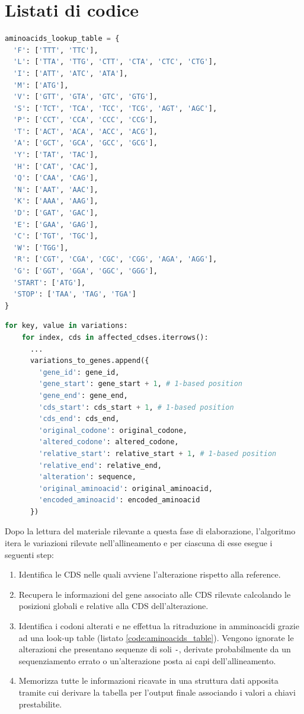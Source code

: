 \documentclass[11pt,italian]{article}
\begin{document}
\newpage
\section{Listati di codice}
\begin{lstlisting}[language=Python,caption=Tabella per la traduzione in amminoacidi,label=code:aminoacids_table]
aminoacids_lookup_table = {
  'F': ['TTT', 'TTC'],
  'L': ['TTA', 'TTG', 'CTT', 'CTA', 'CTC', 'CTG'],
  'I': ['ATT', 'ATC', 'ATA'],
  'M': ['ATG'],
  'V': ['GTT', 'GTA', 'GTC', 'GTG'],
  'S': ['TCT', 'TCA', 'TCC', 'TCG', 'AGT', 'AGC'],
  'P': ['CCT', 'CCA', 'CCC', 'CCG'],
  'T': ['ACT', 'ACA', 'ACC', 'ACG'],
  'A': ['GCT', 'GCA', 'GCC', 'GCG'],
  'Y': ['TAT', 'TAC'],
  'H': ['CAT', 'CAC'],
  'Q': ['CAA', 'CAG'],
  'N': ['AAT', 'AAC'],
  'K': ['AAA', 'AAG'],
  'D': ['GAT', 'GAC'],
  'E': ['GAA', 'GAG'],
  'C': ['TGT', 'TGC'],
  'W': ['TGG'],
  'R': ['CGT', 'CGA', 'CGC', 'CGG', 'AGA', 'AGG'],
  'G': ['GGT', 'GGA', 'GGC', 'GGG'],
  'START': ['ATG'],
  'STOP': ['TAA', 'TAG', 'TGA']
}
\end{lstlisting}

\newpage
\begin{lstlisting}[language=Python,caption=Memorizzazione dei risultati nella struttura dati a lista,label=code:variation_loop]
  for key, value in variations:
    for index, cds in affected_cdses.iterrows():
      ...
      variations_to_genes.append({
        'gene_id': gene_id,
        'gene_start': gene_start + 1, # 1-based position
        'gene_end': gene_end,
        'cds_start': cds_start + 1, # 1-based position
        'cds_end': cds_end,
        'original_codone': original_codone,
        'altered_codone': altered_codone,
        'relative_start': relative_start + 1, # 1-based position
        'relative_end': relative_end,
        'alteration': sequence,
        'original_aminoacid': original_aminoacid,
        'encoded_aminoacid': encoded_aminoacid
      })
\end{lstlisting}

\noindent
Dopo la lettura del materiale rilevante a questa fase di elaborazione, l'algoritmo itera le variazioni rilevate nell'allineamento e per ciascuna di esse esegue i seguenti step:
\begin{enumerate}
  \item Identifica le CDS nelle quali avviene l'alterazione rispetto alla reference.
  \item Recupera le informazioni del gene associato alle CDS rilevate calcolando le posizioni globali e relative alla CDS dell'alterazione.
  \item Identifica i codoni alterati e ne effettua la ritraduzione in amminoacidi grazie ad una look-up table (listato \ref{code:aminoacids_table}). Vengono ignorate le alterazioni che presentano sequenze di soli \lstinline{-}, derivate probabilmente da un sequenziamento errato o un'alterazione posta ai capi dell'allineamento.
  \item Memorizza tutte le informazioni ricavate in una struttura dati apposita tramite cui derivare la tabella per l'output finale associando i valori a chiavi prestabilite.
\end{enumerate}
\end{document}
